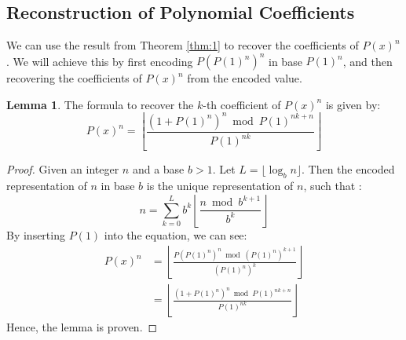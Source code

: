 \documentclass{article}
\theoremstyle{plain}
\theoremstyle{definition}
\newtheorem{lemma}{Lemma}
\begin{document}
\subsection{Reconstruction of Polynomial Coefficients}
We can use the result from Theorem \ref{thm:1} to recover the coefficients of $P(x)^{n}$. We will achieve this by first encoding $P(P(1)^{n})^{n}$ in base $P(1)^{n}$, and then recovering the coefficients of $P(x)^n$ from the encoded value.

\begin{lemma}
    \label{lemma:1}
    The formula to recover the $k$-th coefficient of $P(x)^{n}$ is given by:
    \begin{equation}
        [x^k] P(x)^{n} = \left\lfloor\frac{(1 + P(1)^{n})^{n} \bmod P(1)^{n k + n}}{P(1)^{n k}}\right\rfloor
    \end{equation}
\end{lemma}

\begin{proof}
    Given an integer $n$ and a base $b > 1$. Let $L = \lfloor \log_b{n} \rfloor$. Then the encoded representation of $n$ in base $b$ is the unique representation of $n$, such that \cite{cormen2009introduction}:
    \begin{equation}
        n = \sum_{k=0}^{L} b^{k} \left\lfloor\frac{n \bmod b^{k+1}}{b^{k}}\right\rfloor 
    \end{equation}
    By inserting $P(1)$ into the equation, we can see:
    \begin{align}
        [x^k] P(x)^{n} &= \left\lfloor\frac{P(P(1)^{n})^{n} \bmod (P(1)^{n})^{k+1}}{(P(1)^{n})^{k}}\right\rfloor \\
        &= \left\lfloor\frac{(1 + P(1)^{n})^{n} \bmod P(1)^{n k + n}}{P(1)^{n k}}\right\rfloor
    \end{align}
    Hence, the lemma is proven.
\end{proof}
\end{document}
